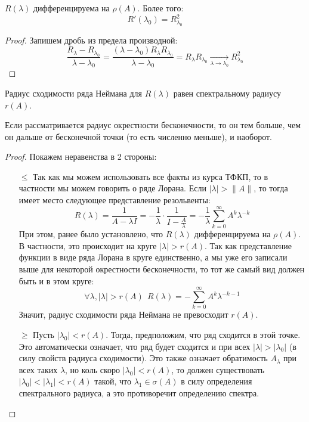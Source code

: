 \begin{proposition}
	$R(\lambda)$ дифференцируема на $\rho(A)$. Более того:
	\[
		R'(\lambda_0) = R_{\lambda_0}^2
	\]
\end{proposition}

\begin{proof}
	Запишем дробь из предела производной:
	\[
		\frac{R_\lambda - R_{\lambda_0}}{\lambda - \lambda_0} = \frac{(\lambda - \lambda_0)R_\lambda R_{\lambda_0}}{\lambda - \lambda_0} = R_\lambda R_{\lambda_0} \xrightarrow[\lambda \to \lambda_0]{} R_{\lambda_0}^2
	\]
\end{proof}

\begin{proposition}
	Радиус сходимости ряда Неймана для $R(\lambda)$ равен спектральному радиусу $r(A)$.
\end{proposition}

\begin{anote}
	Если рассматривается радиус окрестности бесконечности, то он тем больше, чем он дальше от бесконечной точки (то есть численно меньше), и наоборот. 
\end{anote}

\begin{proof}
	Покажем неравенства в 2 стороны:
	\begin{itemize}
		\item[$\le$] Так как мы можем использовать все факты из курса ТФКП, то в частности мы можем говорить о ряде Лорана. Если $|\lambda| > \|A\|$, то тогда имеет место следующее представление резольвенты:
		\[
			R(\lambda) = \frac{1}{A - \lambda I} = -\frac{1}{\lambda} \cdot \frac{1}{I - \frac{A}{\lambda}} = -\frac{1}{\lambda}\sum_{k = 0}^\infty A^k\lambda^{-k}
		\]
		При этом, ранее было установлено, что $R(\lambda)$ дифференцируема на $\rho(A)$. В частности, это происходит на круге $|\lambda| > r(A)$. Так как представление функции в виде ряда Лорана в круге единственно, а мы уже его записали выше для некоторой окрестности бесконечности, то тот же самый вид должен быть и в этом круге:
		\[
			\forall \lambda, |\lambda| > r(A)\ \ R(\lambda) = -\sum_{k = 0}^\infty A^k\lambda^{-k - 1}
		\]
		Значит, радиус сходимости ряда Неймана не превосходит $r(A)$.
		
		\item[$\ge$] Пусть $|\lambda_0| < r(A)$. Тогда, предположим, что ряд сходится в этой точке. Это автоматически означает, что ряд будет сходится и при всех $|\lambda| > |\lambda_0|$ (в силу свойств радиуса сходимости). Это также означает обратимость $A_\lambda$ при всех таких $\lambda$, но коль скоро $|\lambda_0| < r(A)$, то должен существовать $|\lambda_0| < |\lambda_1| < r(A)$ такой, что $\lambda_1 \in \sigma(A)$ в силу определения спектрального радиуса, а это противоречит определению спектра.
	\end{itemize}
\end{proof}

